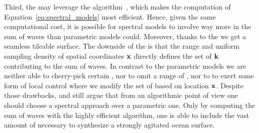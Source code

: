 Third, the \InvDiscreteFourierTransform may leverage the
\FastFourierTransform algorithm~\citep{Cooley:1965}, which makes the computation of
Equation~\ref{eq:spectral_models} most efficient. Hence, given the same
computational cost, it is possible for spectral models to involve way more
\wavenumbers in the sum of waves than parametric models could. Moreover, thanks to
the \DiscreteFourierTransform we get a seamless tileable surface.
The downside of the \FourierTransform is that the range and uniform sampling
density of spatial coordinates $\mathbf{x}$ directly defines the set of \wavevectors
$\mathbf{k}$ contributing to the sum of waves. In contrast to the
parametric models we are neither able to cherry-pick certain \wavevectors,
nor to omit a range of \wavevectors, nor to to exert some form of local control
where we modify the set of \wavevectors based on location $\mathbf{x}$.
Despite those drawbacks, \citet{Mitchell:2005} and \citet{Thon:2000} still
argue that from an algorithmic point of view one should choose a spectral
approach over a parametric one. Only by computing the sum of waves with the
highly efficient \FastFourierTransform algorithm, one is able to include the
vast amount of \wavenumbers necessary to synthesize a strongly agitated ocean
surface.
%
